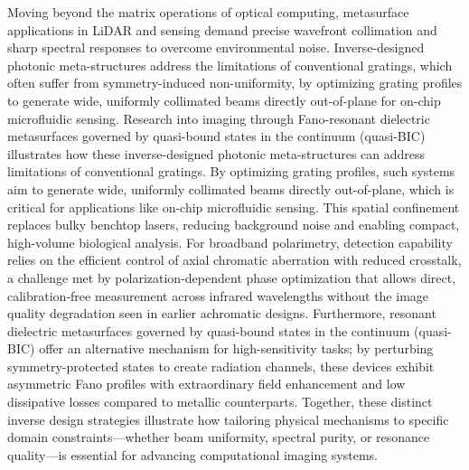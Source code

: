 \documentclass[11pt]{article}
\begin{document}
Moving beyond the matrix operations of optical computing, metasurface applications in LiDAR and sensing demand precise wavefront collimation and sharp spectral responses to overcome environmental noise. Inverse-designed photonic meta-structures address the limitations of conventional gratings, which often suffer from symmetry-induced non-uniformity, by optimizing grating profiles to generate wide, uniformly collimated beams directly out-of-plane for on-chip microfluidic sensing. Research into imaging through Fano-resonant dielectric metasurfaces governed by quasi-bound states in the continuum (quasi-BIC) illustrates how these inverse-designed photonic meta-structures can address limitations of conventional gratings. By optimizing grating profiles, such systems aim to generate wide, uniformly collimated beams directly out-of-plane, which is critical for applications like on-chip microfluidic sensing. \citep{s2_42f2fcc893f3a45ac750a8ffe67752f8533c0c61_58d9419c} This spatial confinement replaces bulky benchtop lasers, reducing background noise and enabling compact, high-volume biological analysis. For broadband polarimetry, detection capability relies on the efficient control of axial chromatic aberration with reduced crosstalk, a challenge met by polarization-dependent phase optimization that allows direct, calibration-free measurement across infrared wavelengths without the image quality degradation seen in earlier achromatic designs. Furthermore, resonant dielectric metasurfaces governed by quasi-bound states in the continuum (quasi-BIC) offer an alternative mechanism for high-sensitivity tasks; by perturbing symmetry-protected states to create radiation channels, these devices exhibit asymmetric Fano profiles with extraordinary field enhancement and low dissipative losses compared to metallic counterparts. Together, these distinct inverse design strategies illustrate how tailoring physical mechanisms to specific domain constraints---whether beam uniformity, spectral purity, or resonance quality---is essential for advancing computational imaging systems. \citep{doi_10_1038_s41598_021_84841_2_2ce5ab57} \citep{doi_10_29026_oea_2022_220058_79ee78ee} \citep{s2_42f2fcc893f3a45ac750a8ffe67752f8533c0c61_58d9419c}
\end{document}
